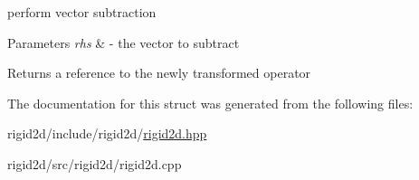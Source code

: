 perform vector subtraction 


\begin{DoxyParams}{Parameters}
{\em rhs} & -\/ the vector to subtract \\
\hline
\end{DoxyParams}
\begin{DoxyReturn}{Returns}
a reference to the newly transformed operator 
\end{DoxyReturn}


The documentation for this struct was generated from the following files\+:\begin{DoxyCompactItemize}
\item 
rigid2d/include/rigid2d/\hyperlink{rigid2d_8hpp}{rigid2d.\+hpp}\item 
rigid2d/src/rigid2d/rigid2d.\+cpp\end{DoxyCompactItemize}
